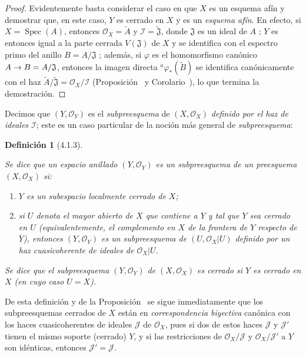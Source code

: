 \documentclass[oneside]{amsart}
\theoremstyle{ega-env-style}
\theoremstyle{ega-thm-env-style}
\theoremstyle{ega-defn-env-style}
\newtheorem*{definition}{Definición}
\renewcommand{\to}{\mathchoice{\longrightarrow}{\rightarrow}{\rightarrow}{\rightarrow}}
\newcommand{\oldpage}[2][]{{\marginnote{\normalfont{\textbf{#1}~|~#2}}}\ignorespaces}
\let\EGAOriginalLabel\label
\renewcommand{\label}[1]{\phantomsection\EGAOriginalLabel{#1}}
\begin{document}
\begin{proof}
\oldpage[I]{120}
Evidentemente basta  considerar el caso en que $X$ es un esquema afín y demostrar que, en este caso, $Y$ es cerrado en $X$ y es un \emph{esquema afín}.
En efecto, si $X=\operatorname{Spec}(A)$, entonces $\mathscr{O}_X=\widetilde{A}$ y $\mathscr{I}=\widetilde{\mathfrak{J}}$, donde $\mathfrak{J}$ es un ideal de $A$ ;
$Y$ es entonces igual a la parte cerrada $V(\mathfrak{J})$ de $X$ y se identifica con el espectro primo del anillo $B=A/\mathfrak{J}$ ;
además, si $\varphi$ es el homomorfismo canónico $A\to B=A/\mathfrak{J}$, entonces la imagen directa ${}^a\varphi_*(\widetilde{B})$ se identifica canónicamente con el haz $\widetilde{A}/\widetilde{\mathfrak{J}}=\mathscr{O}_X/\mathscr{I}$ (Proposición~ y Corolario~), lo que termina la demostración.
\end{proof}

Decimos que $(Y,\mathscr{O}_Y)$ es el \emph{subpreesquema} de $(X,\mathscr{O}_X)$ \emph{definido por el haz de ideales $\mathscr{I}$};
este es un caso particular de la noción más general de \emph{subpreesquema}:

\begin{definition}[4.1.3]
\label{I.4.1.3}
{\itshape Se dice que un espacio anillado $(Y,\mathscr{O}_Y)$ es un subpreesquema de un preesquema $(X,\mathscr{O}_X)$ si:
\begin{enumerate}
  \item[$1^\circ$] $Y$ es un subespacio localmente cerrado de $X$;
  \item[$2^\circ$] si $U$ denota el mayor abierto de $X$ que contiene a $Y$ y tal que $Y$ sea cerrado en $U$ (\textup{equivalentemente,} el complemento en $X$ de la frontera de $Y$ respecto de $\overline{Y}$), entonces $(Y,\mathscr{O}_Y)$ es un subpreesquema de $(U,\mathscr{O}_X|U)$ definido por un haz cuasicoherente de ideales de $\mathscr{O}_X|U$.
\end{enumerate}
Se dice que el subpreesquema $(Y,\mathscr{O}_Y)$ de $(X,\mathscr{O}_X)$ es cerrado si $Y$ es cerrado en $X$ (en cuyo caso $U=X$).}
\end{definition}

De esta definición y de la Proposición~ se sigue inmediatamente que los subpreesquemas cerrados de $X$ están en \emph{correspondencia biyectiva} canónica con los haces cuasicoherentes de ideales $\mathscr{J}$ de $\mathscr{O}_X$, pues si dos de estos haces $\mathscr{J}$ y $\mathscr{J}'$ tienen el mismo soporte (cerrado) $Y$, y si las restricciones de $\mathscr{O}_X/\mathscr{J}$ y $\mathscr{O}_X/\mathscr{J}'$ a $Y$ son idénticas, entonces $\mathscr{J}'=\mathscr{J}$.
\end{document}
